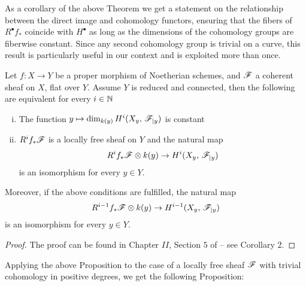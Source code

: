 	As a corollary of the above Theorem we get a statement on the relationship between the direct image and cohomology functors, ensuring that the fibers of $R^\bullet f_*$ coincide with $H^\bullet$ as long as the dimensions of the cohomology groups are fiberwise constant. Since any second cohomology group is trivial on a curve, this result is particularly useful in our context and is exploited more than once.
	\begin{prop}\label{prop:no_jumps}
		Let $f:X\to Y$ be a proper morphism of Noetherian schemes, and $\mathscr{F}$ a coherent sheaf on $X$, flat over $Y$. Assume $Y$ is reduced and connected, then the following are equivalent for every $i\in \mathbb{N}$
		\begin{enumerate}[(i)]
			\item The function $y\mapsto \dim_{k(y)}H^i(X_y,\, \mathscr{F}_{\mid y})$ is constant
			\item $R^i f_* \mathscr{F}$ is a locally free sheaf on $Y$ and the natural map
			$$ R^i f_* \mathscr{F} \otimes k(y) \to H^i(X_y,\, \mathscr{F}_{\mid y}) $$
			is an isomorphism for every $y\in Y$.
		\end{enumerate}
		Moreover, if the above conditions are fulfilled, the natural map
		$$ R^{i-1} f_* \mathscr{F} \otimes k(y) \to H^{i-1}(X_y,\, \mathscr{F}_{\mid y}) $$
		is an isomorphism for every $y\in Y$.
	\end{prop}
	\begin{proof}
		The proof can be found in Chapter $II$, Section $5$ of \cite{MUMAV} -- see Corollary 2.
	\end{proof}
	Applying the above Proposition to the case of a locally free sheaf $\mathscr{F}$ with trivial cohomology in positive degrees, we get the following Proposition:
